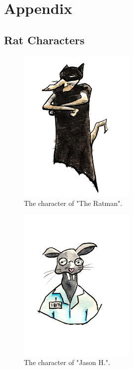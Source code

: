 \documentclass[12pt]{IEEEtran}
\begin{document}
\section{Appendix}
\label{sec:appendix}

\subsection{Rat Characters}
\label{subsec:ratcharacters}

	\begin{figure}[h]
		\centering
		\includegraphics[width=0.5\textwidth]{Rat_Ratman.jpg}
		\caption{The character of "The Ratman".}
		\label{fig:ratman}
	\end{figure}

	\begin{figure}[h]
		\centering
		\includegraphics[width=0.5\textwidth]{Rat_Jason.jpg}
		\caption{The character of "Jason H.".}
		\label{fig:jason}
	\end{figure}
	
\end{document}
